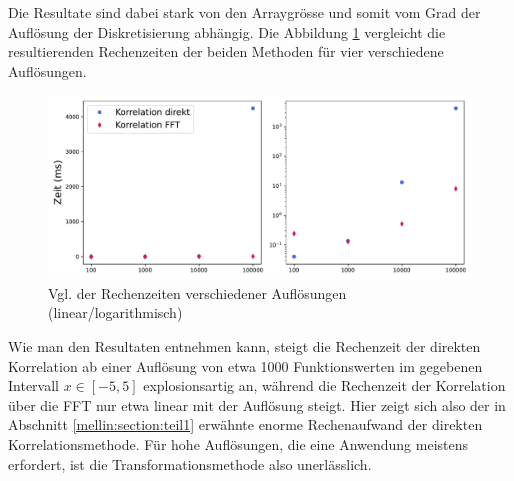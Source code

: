 Die Resultate sind dabei stark von den Arraygrösse und somit vom 
Grad der Auflösung der Diskretisierung abhängig.
Die Abbildung \ref{fig:mellin:zeiten} vergleicht die resultierenden 
Rechenzeiten der beiden Methoden für vier verschiedene Auflösungen.
\begin{figure}
    \centering
    \includegraphics[width=\textwidth]{papers/mellin/images/zeiten.pdf}
    \caption{Vgl. der Rechenzeiten verschiedener Auflösungen (linear/logarithmisch)}
    \label{fig:mellin:zeiten}
\end{figure}
Wie man den Resultaten entnehmen kann, steigt die Rechenzeit der 
direkten Korrelation ab einer Auflösung von etwa 1000 Funktionswerten 
im gegebenen Intervall $x\in \left[-5,5\right]$ explosionsartig an, 
während die Rechenzeit der Korrelation über die FFT nur etwa linear 
mit der Auflösung steigt.
Hier zeigt sich also der in Abschnitt \ref{mellin:section:teil1} 
erwähnte enorme Rechenaufwand der direkten Korrelationsmethode.
Für hohe Auflösungen, die eine Anwendung meistens erfordert, ist die 
Transformationsmethode also unerlässlich.

